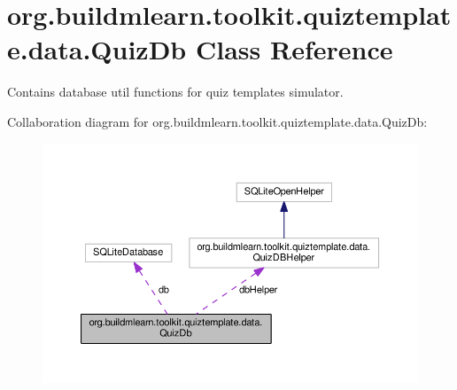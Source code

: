 \hypertarget{classorg_1_1buildmlearn_1_1toolkit_1_1quiztemplate_1_1data_1_1QuizDb}{}\section{org.\+buildmlearn.\+toolkit.\+quiztemplate.\+data.\+Quiz\+Db Class Reference}
\label{classorg_1_1buildmlearn_1_1toolkit_1_1quiztemplate_1_1data_1_1QuizDb}


Contains database util functions for quiz template\textquotesingle{}s simulator.  




Collaboration diagram for org.\+buildmlearn.\+toolkit.\+quiztemplate.\+data.\+Quiz\+Db\+:
\nopagebreak
\begin{figure}[H]
\begin{center}
\leavevmode
\includegraphics[width=350pt]{classorg_1_1buildmlearn_1_1toolkit_1_1quiztemplate_1_1data_1_1QuizDb__coll__graph}
\end{center}
\end{figure}
